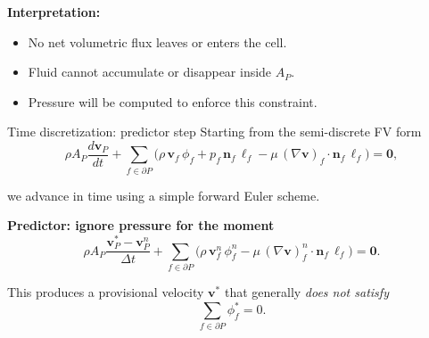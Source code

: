 \documentclass[aspectratio=169]{beamer}
\begin{document}
\begin{frame}
\bigskip
\textbf{Interpretation:}

\begin{itemize}
\item No net volumetric flux leaves or enters the cell.
\item Fluid cannot accumulate or disappear inside $A_P$.
\item Pressure will be computed to enforce this constraint.
\end{itemize}
\end{frame}

\begin{frame}{Time discretization: predictor step}
Starting from the semi-discrete FV form
\[
\rho A_P \frac{d\mathbf{v}_P}{dt}
+
\sum_{f\in\partial P}
\Big(
\rho\,\mathbf{v}_f\,\phi_f
+
p_f\,\mathbf{n}_f\,\ell_f
-
\mu\,(\nabla\mathbf{v})_f\cdot\mathbf{n}_f\,\ell_f
\Big)
=
\mathbf{0},
\]

\bigskip
we advance in time using a simple forward Euler scheme.

\bigskip
\textbf{Predictor: ignore pressure for the moment}
\[
\rho A_P
\frac{\mathbf{v}_P^{*}-\mathbf{v}_P^{n}}{\Delta t}
+
\sum_{f\in\partial P}
\Big(
\rho\,\mathbf{v}_f^{n}\,\phi_f^{n}
-
\mu\,(\nabla\mathbf{v})_f^{n}\cdot\mathbf{n}_f\,\ell_f
\Big)
=
\mathbf{0}.
\]

\bigskip
This produces a provisional velocity $\mathbf{v}^{*}$ that generally
\emph{does not satisfy}
\[
\sum_{f\in\partial P} \phi_f^{*} = 0.
\]
\end{frame}
\end{document}
